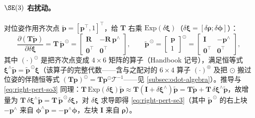\paragraph{$\SE(3)$ 右扰动。}对位姿作用齐次点 $\tilde{\mathbf{p}}=[\mathbf{p}^\top,1]^\top$，给 $\mathbf{T}$ 右乘 $\mathrm{Exp}(\delta\boldsymbol{\xi})$（$\delta\boldsymbol{\xi}=[\delta\boldsymbol{\rho};\delta\boldsymbol{\phi}]$）：
\begin{equation}
  \frac{\partial(\mathbf{T}\tilde{\mathbf{p}})}{\partial\delta\boldsymbol{\xi}}
  =\mathbf{T}\,\tilde{\mathbf{p}}^{\,\odot}
  =\begin{bmatrix}\mathbf{R}&-\mathbf{R}\,\mathbf{p}^\wedge\\\mathbf{0}^\top&\mathbf{0}^\top\end{bmatrix},
  \qquad
  \tilde{\mathbf{p}}^{\,\odot}=\begin{bmatrix}\mathbf{p}\\1\end{bmatrix}^{\!\odot}=\begin{bmatrix}\mathbf{I}&-\mathbf{p}^\wedge\\\mathbf{0}^\top&\mathbf{0}^\top\end{bmatrix},
  \label{eq:right-pert-se3}
\end{equation}
其中 $(\cdot)^\odot$ 是把齐次点变成 $4\times6$ 矩阵的算子（Handbook\cite{carlone2026handbook} 记号），满足恒等式 $\boldsymbol{\xi}^\wedge\tilde{\mathbf{p}}=\tilde{\mathbf{p}}^{\,\odot}\boldsymbol{\xi}$（该算子的完整代数——含与之配对的 $6\times4$ 算子 $(\cdot)^\circledcirc$ 及把 $\odot$ 搬过位姿的伴随恒等式 $(\mathbf{T}\mathbf{p})^\odot=\mathbf{T}\mathbf{p}^\odot\boldsymbol{\mathcal{T}}^{-1}$——见 \cref{subsec:odot-algebra}）。推导与 \cref{eq:right-pert-so3} 同理：$\mathbf{T}\,\mathrm{Exp}(\delta\boldsymbol{\xi})\tilde{\mathbf{p}}\approx\mathbf{T}(\mathbf{I}+\delta\boldsymbol{\xi}^\wedge)\tilde{\mathbf{p}}=\mathbf{T}\tilde{\mathbf{p}}+\mathbf{T}\,\delta\boldsymbol{\xi}^\wedge\tilde{\mathbf{p}}$，故增量为 $\mathbf{T}\,\delta\boldsymbol{\xi}^\wedge\tilde{\mathbf{p}}=\mathbf{T}\,\tilde{\mathbf{p}}^{\,\odot}\delta\boldsymbol{\xi}$，对 $\delta\boldsymbol{\xi}$ 求导即得 \cref{eq:right-pert-se3}（其中 $\tilde{\mathbf{p}}^{\,\odot}$ 的右上块 $-\mathbf{p}^\wedge$ 来自 $\boldsymbol{\phi}^\wedge\mathbf{p}=-\mathbf{p}^\wedge\boldsymbol{\phi}$，左块 $\mathbf{I}$ 来自 $\boldsymbol{\rho}$）。

